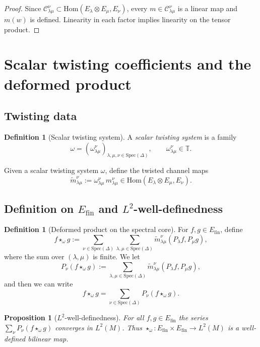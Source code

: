 \documentclass[11pt]{amsart}
\theoremstyle{plain}
\newtheorem{proposition}[theorem]{Proposition}
\theoremstyle{definition}
\newtheorem{definition}[theorem]{Definition}
\theoremstyle{remark}
\newcommand{\Spec}{\mathrm{Spec}}
\newcommand{\Hom}{\mathrm{Hom}}
\newcommand{\bbT}{\mathbb{T}}
\newcommand{\cC}{\mathcal{C}}
\begin{document}
\begin{proof}
Since $\cC^{\nu}_{\lambda\mu}\subset\Hom(E_\lambda\otimes E_\mu,E_\nu)$, every $m\in\cC^{\nu}_{\lambda\mu}$ is a linear map
and $m(w)$ is defined. Linearity in each factor implies linearity on the tensor product.
\end{proof}

\section{Scalar twisting coefficients and the deformed product}

\subsection{Twisting data}

\begin{definition}[Scalar twisting system]
A \emph{scalar twisting system} is a family
\[ \omega= (\omega^{\nu}_{\lambda\mu})_{\lambda,\mu,\nu\in\Spec(\Delta)},\qquad \omega^{\nu}_{\lambda\mu}\in\bbT. \]
\end{definition}

Given a scalar twisting system $\omega$, define the twisted channel maps
\[ \widetilde m^{\nu}_{\lambda\mu}:=\omega^{\nu}_{\lambda\mu}\,m^{\nu}_{\lambda\mu}\in\Hom(E_\lambda\otimes E_\mu,E_\nu). \]

\subsection{Definition on $E_{\mathrm{fin}}$ and $L^2$-well-definedness}

\begin{definition}[Deformed product on the spectral core]\label{def:star}
For $f,g\in E_{\mathrm{fin}}$, define
\[ f\star_\omega g := \sum_{\nu\in\Spec(\Delta)}\sum_{\lambda,\mu\in\Spec(\Delta)} \widetilde m^{\nu}_{\lambda\mu}(P_\lambda f,P_\mu g), \]
where the sum over $(\lambda,\mu)$ is finite. We let 
\[ 
P_\nu(f\star_\omega g) := \sum_{\lambda,\mu\in\Spec(\Delta)} \widetilde m^{\nu}_{\lambda\mu}(P_\lambda f,P_\mu g),
\]
and then we can write
\[
f\star_\omega g = \sum_{\nu\in\Spec(\Delta)} P_\nu(f\star_\omega g).
\]
\end{definition}

\begin{proposition}[$L^2$-well-definedness]\label{prop:L2-well}
For all $f,g\in E_{\mathrm{fin}}$ the series $\sum_{\nu}P_\nu(f\star_\omega g)$ converges in $L^2(M)$.
Thus $\star_\omega:E_{\mathrm{fin}}\times E_{\mathrm{fin}}\to L^2(M)$ is a well-defined bilinear map.
\end{proposition}
\end{document}
